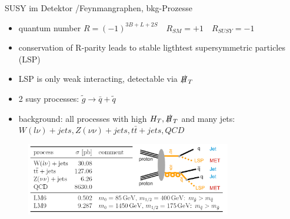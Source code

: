 \begin{frame}{SUSY im Detektor /Feynmangraphen, bkg-Prozesse  }

\begin{itemize}
\item quantum number $R=(-1)^{3B+L+2S} \quad R_{SM}=+1 \quad R_{SUSY}=-1$ \\
\item conservation of R-parity leads to stable ligthtest supersymmetric particles (LSP)\\
\item LSP is only weak interacting, detectable via $\slashed{H}_T$ \\
\item 2 susy processes: \quad $\tilde{g} \rightarrow \bar{q}+\tilde{q}$\\%
\item background: all processes with high $H_T, \slashed{H}_T$ and many jets:
$W(l\nu)+jets, Z(\nu\nu)+jets, t\bar{t}+jets, QCD$ 

\end{itemize}

\begin{figure}[H]
	\centering
	 \includegraphics[width=0.8\textwidth,]{figures/feynman+bkg.png}
\end{figure}
\end{frame}



